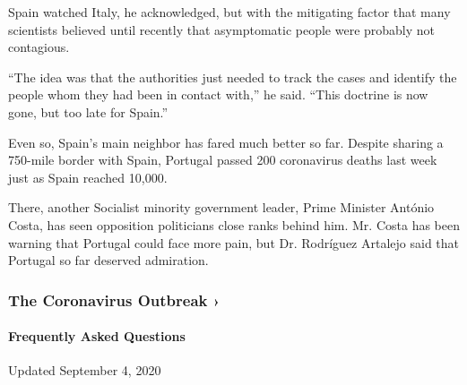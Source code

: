 Spain watched Italy, he acknowledged, but with the mitigating factor
that many scientists believed until recently that asymptomatic people
were probably not contagious.

``The idea was that the authorities just needed to track the cases and
identify the people whom they had been in contact with,'' he said.
``This doctrine is now gone, but too late for Spain.''

Even so, Spain's main neighbor has fared much better so far. Despite
sharing a 750-mile border with Spain, Portugal passed 200 coronavirus
deaths last week just as Spain reached 10,000.

There, another Socialist minority government leader, Prime Minister
António Costa, has seen opposition politicians close ranks behind him.
Mr. Costa has been warning that Portugal could face more pain, but Dr.
Rodríguez Artalejo said that Portugal so far deserved admiration.

\href{https://www.nytimes3xbfgragh.onion/news-event/coronavirus?action=click\&pgtype=Article\&state=default\&region=MAIN_CONTENT_3\&context=storylines_faq}{}

\hypertarget{the-coronavirus-outbreak-}{%
\subsubsection{The Coronavirus Outbreak
›}\label{the-coronavirus-outbreak-}}

\hypertarget{frequently-asked-questions}{%
\paragraph{Frequently Asked
Questions}\label{frequently-asked-questions}}

Updated September 4, 2020

